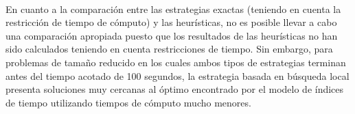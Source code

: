 \documentclass[spanish]{article}
\begin{document}
		\paragraph{}
		En cuanto a la comparación entre las estrategias exactas (teniendo en cuenta la restricción de tiempo de cómputo) y las heurísticas, no es posible llevar a cabo una comparación apropiada puesto que los resultados de las heurísticas no han sido calculados teniendo en cuenta restricciones de tiempo. Sin embargo, para problemas de tamaño reducido en los cuales ambos tipos de estrategias terminan antes del tiempo acotado de 100 segundos, la estrategia basada en búsqueda local presenta soluciones muy cercanas al óptimo encontrado por el modelo de índices de tiempo utilizando tiempos de cómputo mucho menores.

	\nocite{subject:mio}
	\nocite{garciparedes:mosel-examples}
	\nocite{tool:xpress-mosel}
	\nocite{tool:neos-server}
	
  
\end{document}
